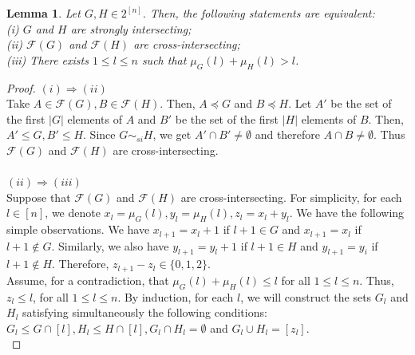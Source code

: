 \documentclass[reqno,english]{amsart}
\theoremstyle{plain}
\newtheorem{lem}[theorem]{Lemma}
\theoremstyle{remark}
\newcommand{\0}[0]{\emptyset}
\renewcommand{\1}[0]{\textbf{1}}
\theoremstyle{plain}
\theoremstyle{remark}
\renewcommand{\1}[0]{\textbf{1}}
\begin{document}
\begin{lem}\label{lem2} Let $G,H \in 2^{[n]}$. Then, the following statements are equivalent:\\
(i) $G$ and $H$ are strongly intersecting;\\
(ii) $\mathcal{F}(G)$ and $\mathcal{F}(H)$ are cross-intersecting;\\
(iii) There exists $1 \leq l \leq n$ such that $\mu_{G}(l)+\mu_{H}(l) > l$.
\end{lem}
\begin{proof} $(i) \Rightarrow (ii)$\\
Take $A \in \mathcal{F}(G), B \in \mathcal{F}(H)$. Then, $A \preceq G$ and $B \preceq H$. Let $A'$ be the set of the first $|G|$ elements of $A$ and $B'$ be the set of the first $|H|$ elements of $B$. Then, $A' \leq G, B' \leq H$. Since $G \sim_{si} H$, we get $A' \cap B' \neq \emptyset$ and therefore $A \cap B \neq \emptyset$.
Thus $\mathcal{F}(G)$ and $\mathcal{F}(H)$ are cross-intersecting.\\ \\
$(ii) \Rightarrow (iii)$\\
Suppose that $\mathcal{F}(G)$ and $\mathcal{F}(H)$ are cross-intersecting. For simplicity, for each $l \in [n]$, we denote $x_{l}=\mu_{G}(l), y_{l}=\mu_{H}(l), z_{l}=x_{l}+y_{l}$. We have the following simple observations. We have $x_{l+1}=x_{l}+1$ if $l+1 \in G$ and $x_{l+1}=x_{l}$ if $l+1 \notin G$. Similarly, we also have $y_{l+1}=y_{l}+1$ if $l+1 \in H$ and $y_{l+1}=y_{i}$ if $l+1 \notin H$. Therefore, $z_{l+1}-z_{l} \in \{0,1,2\}$.\\
Assume, for a contradiction, that $\mu_{G}(l)+\mu_{H}(l) \leq l$ for all $1 \leq l \leq n$. Thus, $z_{l} \leq l$, for all $1 \leq l \leq n$. By induction, for each $l$, we will construct the sets $G_{l}$ and $H_{l}$ satisfying simultaneously the following conditions: $G_{l} \leq G \cap [l], H_{l} \leq H \cap [l], G_{l} \cap H_{l}= \emptyset$ and $G_{l} \cup H_{l}=[z_{l}]$.\\ 


\end{proof}
\end{document}
